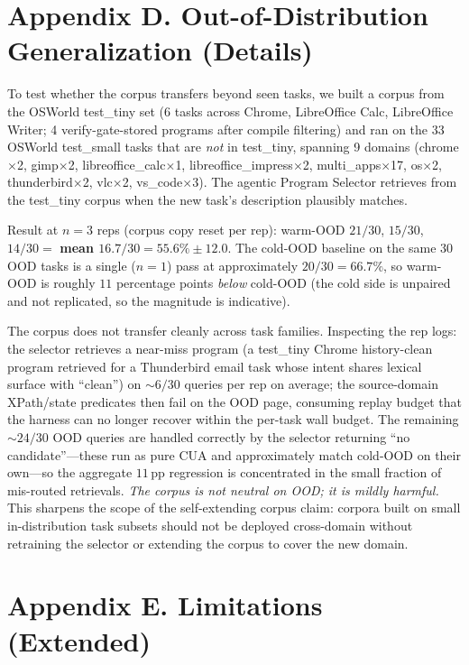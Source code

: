 \documentclass[11pt]{article}
\begin{document}
\section*{Appendix D. Out-of-Distribution Generalization (Details)}
\label{sec:appendix-ood}

To test whether the corpus transfers beyond seen tasks, we built a corpus from the OSWorld test\_tiny set (6 tasks across Chrome, LibreOffice Calc, LibreOffice Writer; 4 verify-gate-stored programs after compile filtering) and ran on the 33 OSWorld test\_small tasks that are \emph{not} in test\_tiny, spanning 9 domains (chrome$\times$2, gimp$\times$2, libreoffice\_calc$\times$1, libreoffice\_impress$\times$2, multi\_apps$\times$17, os$\times$2, thunderbird$\times$2, vlc$\times$2, vs\_code$\times$3). The agentic Program Selector retrieves from the test\_tiny corpus when the new task's description plausibly matches.

Result at $n{=}3$ reps (corpus copy reset per rep): warm-OOD $21/30$, $15/30$, $14/30 = $ \textbf{mean $16.7/30 = 55.6\% \pm 12.0$}. The cold-OOD baseline on the same 30 OOD tasks is a single ($n{=}1$) pass at approximately $20/30 = 66.7\%$, so warm-OOD is roughly $11$ percentage points \emph{below} cold-OOD (the cold side is unpaired and not replicated, so the magnitude is indicative).

The corpus does not transfer cleanly across task families. Inspecting the rep logs: the selector retrieves a near-miss program (a test\_tiny Chrome history-clean program retrieved for a Thunderbird email task whose intent shares lexical surface with ``clean'') on $\sim 6/30$ queries per rep on average; the source-domain XPath/state predicates then fail on the OOD page, consuming replay budget that the harness can no longer recover within the per-task wall budget. The remaining $\sim 24/30$ OOD queries are handled correctly by the selector returning ``no candidate''---these run as pure CUA and approximately match cold-OOD on their own---so the aggregate $11$\,pp regression is concentrated in the small fraction of mis-routed retrievals. \emph{The corpus is not neutral on OOD; it is mildly harmful.} This sharpens the scope of the self-extending corpus claim: corpora built on small in-distribution task subsets should not be deployed cross-domain without retraining the selector or extending the corpus to cover the new domain.

\section*{Appendix E. Limitations (Extended)}
\label{sec:appendix-limitations}
\end{document}
